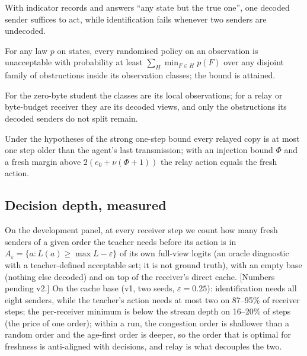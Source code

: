 \begin{claim}\label{cl:actid}
With indicator records and answers ``any state but the true one'', one decoded sender suffices to act, while
identification fails whenever two senders are undecoded. 
\end{claim}

\begin{claim}\label{cl:mass}
For any law $p$ on states, every randomised policy on an observation is unacceptable with probability at least
$\sum_H\min_{F\in H}p(F)$ over any disjoint family of obstructions inside its observation classes; the bound is attained.
\end{claim}
For the zero-byte student the classes are its local observations; for a relay or byte-budget receiver they are its
decoded views, and only the obstructions its decoded senders do not split remain.

\begin{claim}\label{cl:h7}
Under the hypotheses of the strong one-step bound every relayed copy is at most one step older than the agent's last
transmission; with an injection bound $\Phi$ and a fresh margin above $2(e_0+\nu(\Phi+1))$ the relay action equals the
fresh action. 
\end{claim}

\subsection{Decision depth, measured}\label{sec:res-depth}
On the development panel, at every receiver step we count how many fresh senders of a given order the teacher needs
before its action is in $A_\varepsilon=\{a: L(a)\ge\max L-\varepsilon\}$ of its own full-view logits (an oracle diagnostic
with a teacher-defined acceptable set; it is not ground truth), with an empty base (nothing else decoded) and on top of
the receiver's direct cache. [Numbers pending v2.]  On the cache base (v1, two seeds, $\varepsilon=0.25$): identification
needs all eight senders, while the teacher's action needs at most two on 87--95\% of receiver steps; the per-receiver
minimum is below the stream depth on 16--20\% of steps (the price of one order); within a run, the congestion order is
shallower than a random order and the age-first order is deeper, so the order that is optimal for freshness is
anti-aligned with decisions, and relay is what decouples the two.
